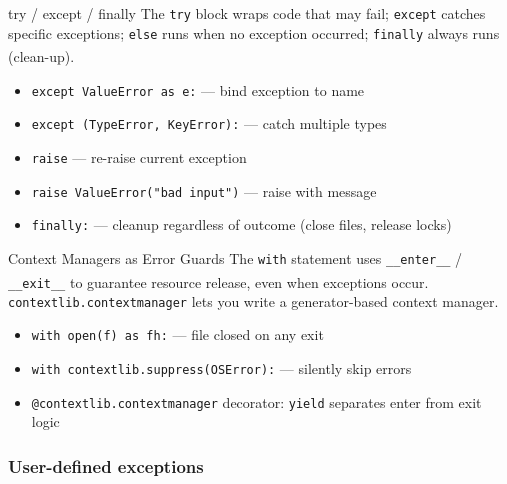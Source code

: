 \begin{v3topic}{try / except / finally}
    The \texttt{try} block wraps code that may fail; \texttt{except} catches specific exceptions; \texttt{else} runs when no exception occurred; \texttt{finally} always runs (clean-up)\textsuperscript{\cite{romanoLearnPythonProgramming2021}}.
\visualseparator
    \begin{itemize}
        \item \texttt{except ValueError as e:} --- bind exception to name
        \item \texttt{except (TypeError, KeyError):} --- catch multiple types
        \item \texttt{raise} --- re-raise current exception
        \item \texttt{raise ValueError("bad input")} --- raise with message
        \item \texttt{finally:} --- cleanup regardless of outcome (close files, release locks)
    \end{itemize}

\end{v3topic}
\begin{v3topic}{Context Managers as Error Guards}
    The \texttt{with} statement uses \texttt{\_\_enter\_\_} / \texttt{\_\_exit\_\_} to guarantee resource release, even when exceptions occur\textsuperscript{\cite{romanoLearnPythonProgramming2021}}.
    \texttt{contextlib.contextmanager} lets you write a generator-based context manager.
\visualseparator
    \begin{itemize}
        \item \texttt{with open(f) as fh:} --- file closed on any exit
        \item \texttt{with contextlib.suppress(OSError):} --- silently skip errors
        \item \texttt{@contextlib.contextmanager} decorator: \texttt{yield} separates enter from exit logic
    \end{itemize}
\end{v3topic}

\subsubsection{User-defined exceptions}

